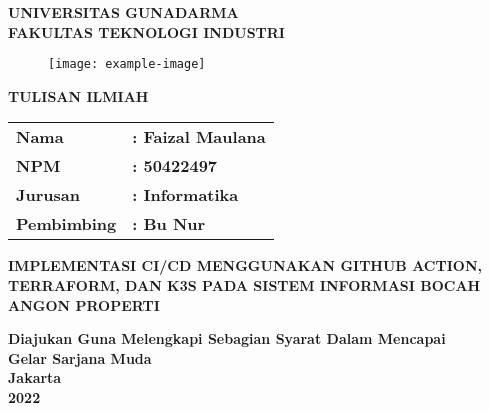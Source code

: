 \begin{center}
  \textbf{UNIVERSITAS GUNADARMA} \\
  \textbf{FAKULTAS TEKNOLOGI INDUSTRI}
\end{center}

\begin{figure}[H]
  \centering
  \texttt{[image: example-image]}
\end{figure}

\begin{center}
  \textbf{TULISAN ILMIAH}
\end{center}

\begin{table}[H]
  \centering
  \begin{tabular}{l l}  %
    \textbf{Nama} & \textbf{: Faizal Maulana} \\
    \textbf{NPM} & \textbf{: 50422497} \\
    \textbf{Jurusan} & \textbf{: Informatika} \\
    \textbf{Pembimbing} & \textbf{: Bu Nur} \\
  \end{tabular}
\end{table}

\begin{center}
  \textbf{IMPLEMENTASI CI/CD MENGGUNAKAN GITHUB ACTION, TERRAFORM, DAN K3S PADA SISTEM INFORMASI BOCAH ANGON PROPERTI}
\end{center}

\begin{center}
  \textbf{Diajukan Guna Melengkapi Sebagian Syarat Dalam Mencapai} \\
  \textbf{Gelar Sarjana Muda} \\
  \textbf{Jakarta} \\
  \textbf{2022}
\end{center}